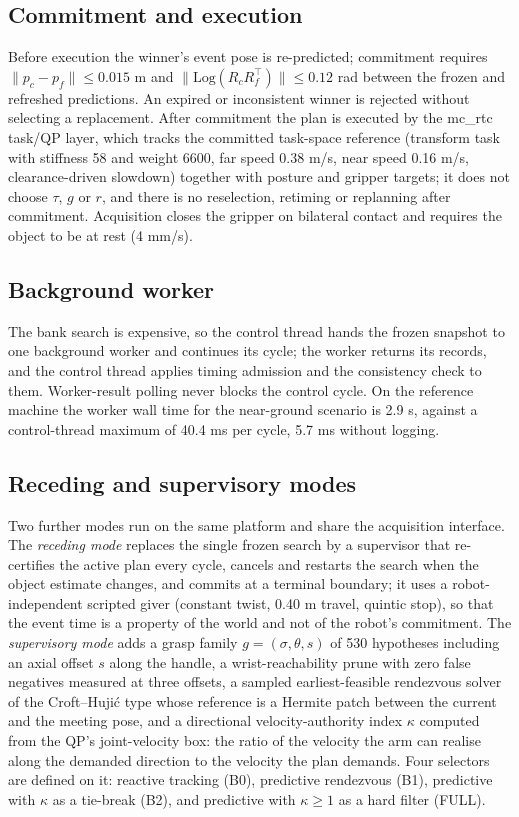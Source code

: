 \documentclass[conference]{IEEEtran}
\begin{document}
\subsection{Commitment and execution}\label{sec:commit}
Before execution the winner's event pose is re-predicted; commitment requires $\|p_c - p_f\|\le 0.015$ m and $\|\mathrm{Log}(R_cR_f^\top)\|\le 0.12$ rad between the frozen and refreshed predictions. An expired or inconsistent winner is rejected without selecting a replacement. After commitment the plan is executed by the mc\_rtc task/QP layer, which tracks the committed task-space reference (transform task with stiffness 58 and weight 6600, far speed 0.38 m/s, near speed 0.16 m/s, clearance-driven slowdown) together with posture and gripper targets; it does not choose $\tau$, $g$ or $r$, and there is no reselection, retiming or replanning after commitment. Acquisition closes the gripper on bilateral contact and requires the object to be at rest (4 mm/s).

\subsection{Background worker}\label{sec:async}
The bank search is expensive, so the control thread hands the frozen snapshot to one background worker and continues its cycle; the worker returns its records, and the control thread applies timing admission and the consistency check to them. Worker-result polling never blocks the control cycle. On the reference machine the worker wall time for the near-ground scenario is 2.9 s, against a control-thread maximum of 40.4 ms per cycle, 5.7 ms without logging.

\subsection{Receding and supervisory modes}\label{sec:modes}
Two further modes run on the same platform and share the acquisition interface. The \emph{receding mode} replaces the single frozen search by a supervisor that re-certifies the active plan every cycle, cancels and restarts the search when the object estimate changes, and commits at a terminal boundary; it uses a robot-independent scripted giver (constant twist, 0.40 m travel, quintic stop), so that the event time is a property of the world and not of the robot's commitment. The \emph{supervisory mode} adds a grasp family $g = (\sigma, \theta, s)$ of 530 hypotheses including an axial offset $s$ along the handle, a wrist-reachability prune with zero false negatives measured at three offsets, a sampled earliest-feasible rendezvous solver of the Croft--Huji\'c type whose reference is a Hermite patch between the current and the meeting pose, and a directional velocity-authority index $\kappa$ computed from the QP's joint-velocity box: the ratio of the velocity the arm can realise along the demanded direction to the velocity the plan demands. Four selectors are defined on it: reactive tracking (B0), predictive rendezvous (B1), predictive with $\kappa$ as a tie-break (B2), and predictive with $\kappa\ge1$ as a hard filter (FULL).
\end{document}
